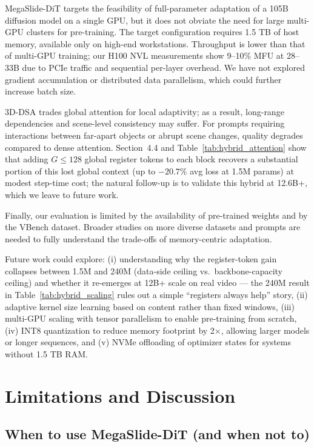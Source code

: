 \documentclass[11pt, letterpaper]{article}
\begin{document}
MegaSlide-DiT targets the feasibility of full-parameter adaptation of a 105B diffusion model on a single GPU, but it does not obviate the need for large multi-GPU clusters for pre-training. The target configuration requires 1.5 TB of host memory, available only on high-end workstations. Throughput is lower than that of multi-GPU training; our H100 NVL measurements show 9--10\% MFU at 28--33B due to PCIe traffic and sequential per-layer overhead. We have not explored gradient accumulation or distributed data parallelism, which could further increase batch size.

3D-DSA trades global attention for local adaptivity; as a result, long-range dependencies and scene-level consistency may suffer. For prompts requiring interactions between far-apart objects or abrupt scene changes, quality degrades compared to dense attention. Section~4.4 and Table~\ref{tab:hybrid_attention} show that adding $G\!\leq\!128$ global register tokens to each block recovers a substantial portion of this lost global context (up to $-20.7\%$ avg loss at 1.5M params) at modest step-time cost; the natural follow-up is to validate this hybrid at 12.6B+, which we leave to future work.

Finally, our evaluation is limited by the availability of pre-trained weights and by the VBench dataset. Broader studies on more diverse datasets and prompts are needed to fully understand the trade-offs of memory-centric adaptation.

Future work could explore: (i) understanding why the register-token gain collapses between 1.5M and 240M (data-side ceiling vs.\ backbone-capacity ceiling) and whether it re-emerges at 12B+ scale on real video --- the 240M result in Table~\ref{tab:hybrid_scaling} rules out a simple ``registers always help'' story, (ii) adaptive kernel size learning based on content rather than fixed windows, (iii) multi-GPU scaling with tensor parallelism to enable pre-training from scratch, (iv) INT8 quantization to reduce memory footprint by 2$\times$, allowing larger models or longer sequences, and (v) NVMe offloading of optimizer states for systems without 1.5 TB RAM.

\section{Limitations and Discussion}

\subsection{When to use MegaSlide-DiT (and when not to)}
\end{document}
